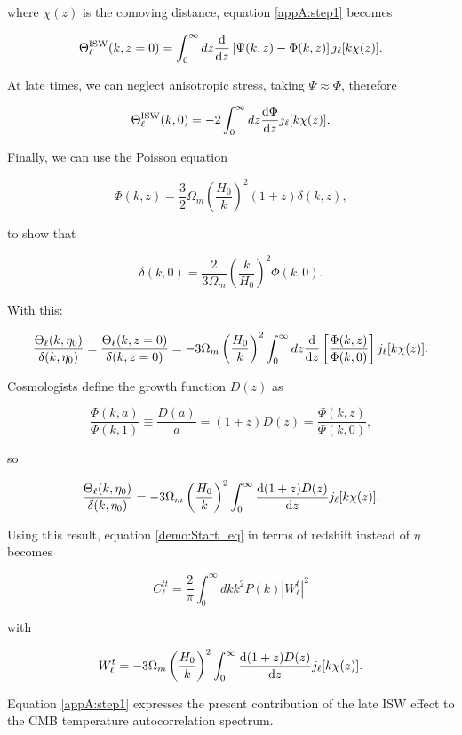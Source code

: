 \documentclass[openany,a4paper,12pt,oneside]{book}
\begin{document}
\begin{spacing}{1.5}
\noindent where $\chi(z)$ is the comoving distance, equation \eqref{appA:step1} becomes

\begin{equation}
	\Theta_\ell^\text{ISW}(k,z=0)=\int_0^\infty dz \dv{}{z}\left[\Psi(k,z)-\Phi(k,z)\right]j_\ell[k\chi(z)].
\end{equation}

At late times, we can neglect anisotropic stress, taking $\Psi\approx \Phi$, therefore

\begin{equation}
	\Theta_\ell^\text{ISW}(k,0)=-2\int_0^\infty dz \dv{\Phi}{z}j_\ell [k\chi(z)].
\end{equation}

Finally, we can use the Poisson equation

\begin{equation}
	\Phi(k,z)=\frac{3}{2}\Omega_m \left(\frac{H_0}{k}\right)^2(1+z)\delta(k,z),
\end{equation}

\noindent to show that

\begin{equation}
	\delta(k,0)=\frac{2}{3\Omega_m}\left(\frac{k}{H_0}\right)^2\Phi(k,0).
\end{equation}

With this:

\begin{equation}
	\frac{\Theta_\ell(k,\eta_0)}{\delta(k,\eta_0)}=\frac{\Theta_\ell(k,z=0)}{\delta(k,z=0)}=-3\Omega_m\left(\frac{H_0}{k}\right)^2\int_0^\infty dz \dv{}{z}\left[\frac{\Phi(k,z)}{\Phi(k,0)}\right]j_\ell[k\chi(z)].
\end{equation}

Cosmologists define the growth function $D(z)$ as

\begin{equation}
	\frac{\Phi(k,a)}{\Phi(k,1)}\equiv\frac{D(a)}{a}=(1+z)D(z)=\frac{\Phi(k,z)}{\Phi(k,0)},
\end{equation}

so

\begin{equation}
	\frac{\Theta_\ell(k,\eta_0)}{\delta(k,\eta_0)}=-3\Omega_m\left(\frac{H_0}{k}\right)^2\int_0^\infty \dv{(1+z)D(z)}{z}j_\ell[k\chi(z)].
\end{equation}

Using this result, equation \eqref{demo:Start_eq} in terms of redshift instead of $\eta$ becomes

\begin{equation}\label{AppA:eq_final}
	C_\ell^{tt}=\frac{2}{\pi}\int_0^\infty dk k^2P(k)|W_\ell^t|^2
\end{equation}

\noindent with 

\begin{equation}
	W_\ell^t=-3\Omega_m\left(\frac{H_0}{k}\right)^2\int_0^\infty \dv{(1+z)D(z)}{z}j_\ell[k\chi(z)].
\end{equation}

Equation \eqref{appA:step1} expresses the present contribution of the late ISW  effect to the CMB temperature autocorrelation spectrum.

\end{spacing}
\endgroup

\printbibliography
\end{document}
